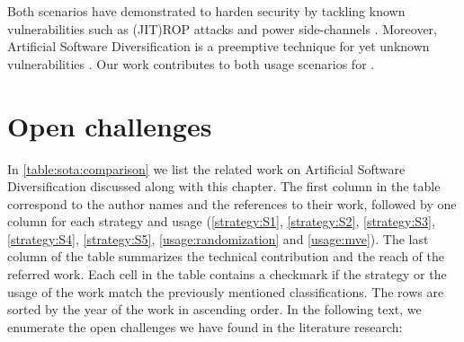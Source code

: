 %

Both scenarios have demonstrated to harden security by tackling known vulnerabilities such as (JIT)ROP attacks \cite{jackson2011compiler} and power side-channels \cite{amarilli2011can}. Moreover, Artificial Software Diversification is a preemptive technique for yet unknown vulnerabilities \cite{jackson}. Our work contributes to both usage scenarios for \wasm.



\section{Open challenges}
\label{sota:openchallenges}

In \autoref{table:sota:comparison} we list the related work on Artificial Software Diversification discussed along with this chapter. The first column in the table correspond to the author names and the references to their work, followed by one column for each strategy and usage (\autoref{strategy:S1},  \autoref{strategy:S2},  \autoref{strategy:S3},  \autoref{strategy:S4},  \autoref{strategy:S5}, \autoref{usage:randomization} and \autoref{usage:mve}). The last column of the table summarizes the technical contribution and the reach of the referred work. Each cell in the table contains a checkmark if the strategy or the usage of the work match the previously mentioned classifications. The rows are sorted by the year of the work in ascending order. 
In the following text, we enumerate the open challenges we have found in the literature research:

